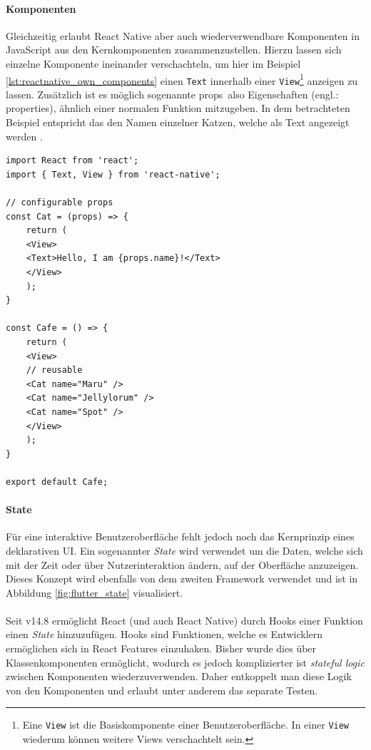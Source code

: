 \paragraph{Komponenten}
Gleichzeitig erlaubt React Native aber auch wiederverwendbare Komponenten in JavaScript aus den Kernkomponenten zusammenzustellen.
Hierzu lassen sich einzelne Komponente ineinander verschachteln, um hier im Beispiel \ref{lst:reactnative_own_components} einen \texttt{Text} innerhalb einer \texttt{View}\footnote{Eine \texttt{View} ist die Basiskomponente einer Benutzeroberfläche. In einer \texttt{View} wiederum können weitere Views verschachtelt sein.} anzeigen zu lassen.
Zusätzlich ist es möglich sogenannte \glqq props\grqq \, also Eigenschaften (engl.: properties), ähnlich einer normalen Funktion mitzugeben.
In dem betrachteten Beispiel entspricht das den Namen einzelner Katzen, welche als Text angezeigt werden \cite{reactnative2021}.\\

\begin{lstlisting}[caption=Eigene Komponenten, label=lst:reactnative_own_components]
import React from 'react';
import { Text, View } from 'react-native';

// configurable props
const Cat = (props) => {
	return (
	<View>
	<Text>Hello, I am {props.name}!</Text>
	</View>
	);
}

const Cafe = () => {
	return (
	<View>
	// reusable
	<Cat name="Maru" />
	<Cat name="Jellylorum" />
	<Cat name="Spot" />
	</View>
	);
}

export default Cafe;
\end{lstlisting}


\paragraph{State}
Für eine interaktive Benutzeroberfläche fehlt jedoch noch das Kernprinzip eines deklarativen UI. Ein sogenannter \textit{State} wird verwendet um die Daten, welche sich mit der Zeit oder über Nutzerinteraktion ändern, auf der Oberfläche anzuzeigen. Dieses Konzept wird ebenfalls von dem zweiten Framework verwendet und ist in Abbildung \ref{fig:flutter_state} visualisiert.\\
\\
Seit v14.8 ermöglicht React (und auch React Native)  durch Hooks einer Funktion einen \textit{State} hinzuzufügen. Hooks sind Funktionen, welche es Entwicklern ermöglichen sich in React Features einzuhaken. Bisher wurde dies über Klassenkomponenten ermöglicht, wodurch es jedoch komplizierter ist \textit{stateful logic} zwischen Komponenten wiederzuverwenden. Daher entkoppelt man diese Logik von den Komponenten und erlaubt unter anderem das separate Testen.\\

